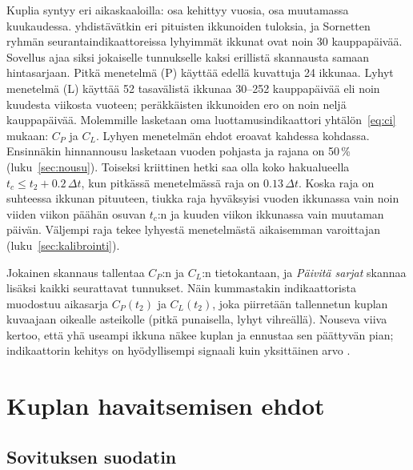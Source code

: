 \documentclass[10pt,a4paper]{article}
\newcommand{\tc}{t_c}
\begin{document}
Kuplia syntyy eri aikaskaaloilla: osa kehittyy vuosia, osa muutamassa kuukaudessa.
\citet{zhang2016} yhdistävätkin eri pituisten ikkunoiden tuloksia, ja Sornetten ryhmän
seurantaindikaattoreissa lyhyimmät ikkunat ovat noin 30 kauppapäivää. Sovellus ajaa siksi
jokaiselle tunnukselle kaksi erillistä skannausta samaan hintasarjaan. Pitkä menetelmä (P)
käyttää edellä kuvattuja 24 ikkunaa. Lyhyt menetelmä (L) käyttää 52 tasavälistä ikkunaa
30--252 kauppapäivää eli noin kuudesta viikosta vuoteen; peräkkäisten ikkunoiden ero on noin
neljä kauppapäivää.
Molemmille lasketaan oma luottamusindikaattori yhtälön~\eqref{eq:ci} mukaan: $C_P$ ja $C_L$.
Lyhyen menetelmän ehdot eroavat kahdessa kohdassa. Ensinnäkin hinnannousu lasketaan vuoden
pohjasta ja rajana on 50\,\% (luku~\ref{sec:nousu}). Toiseksi kriittinen hetki saa olla koko
hakualueella $\tc \le t_2 + 0.2\,\Delta t$, kun pitkässä menetelmässä raja on $0.13\,\Delta t$.
Koska raja on suhteessa ikkunan pituuteen, tiukka raja hyväksyisi vuoden ikkunassa vain noin
viiden viikon päähän osuvan $\tc$:n ja kuuden viikon ikkunassa vain muutaman päivän. Väljempi
raja tekee lyhyestä menetelmästä aikaisemman varoittajan (luku~\ref{sec:kalibrointi}).

Jokainen skannaus tallentaa $C_P$:n ja $C_L$:n tietokantaan, ja \emph{Päivitä sarjat} skannaa
lisäksi kaikki seurattavat tunnukset. Näin kummastakin indikaattorista muodostuu aikasarja
$C_P(t_2)$ ja $C_L(t_2)$, joka piirretään tallennetun kuplan kuvaajaan oikealle asteikolle
(pitkä punaisella, lyhyt vihreällä). Nouseva viiva kertoo, että yhä useampi ikkuna näkee
kuplan ja ennustaa sen päättyvän pian; indikaattorin kehitys on hyödyllisempi signaali kuin
yksittäinen arvo \citep{zhang2016}.

\section{Kuplan havaitsemisen ehdot}\label{sec:ehdot}

\subsection{Sovituksen suodatin}\label{sec:suodatin}
\end{document}
